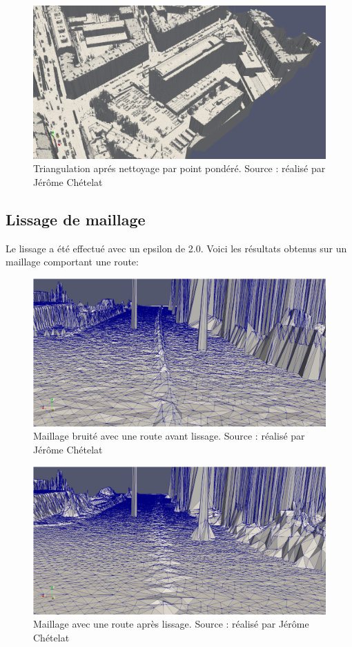 \begin{figure}[htbp!]
    \centering
	\includegraphics[width=0.9\linewidth]{figures/filters/hepia_filtered_pond_stl.png}
	\caption{Triangulation aprés nettoyage par point pondéré. Source : réalisé par Jérôme Chételat}
	\label{fig:hepia_filt_pond_stl}
\end{figure}


\newpage
\subsection{Lissage de maillage}

Le lissage a été effectué avec un epsilon de 2.0.
Voici les résultats obtenus sur un maillage comportant une route: 

\begin{figure}[htbp!]
    \centering
    \includegraphics[width=0.8\linewidth]{figures/mesh_noise.png}
    \caption{Maillage bruité avec une route avant lissage. Source : réalisé par Jérôme Chételat}
    \label{fig:mesh_noise}
\end{figure}

\begin{figure}[htbp!]
    \centering
    \includegraphics[width=0.8\linewidth]{figures/mesh_noise_not_noise.png}
    \caption{Maillage avec une route après lissage. Source : réalisé par Jérôme Chételat}
    \label{fig:mesh_noise_not_noise}
\end{figure}

